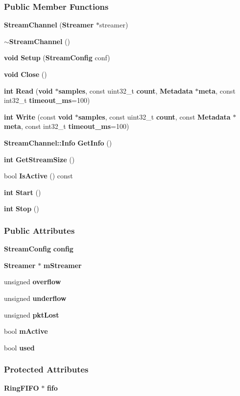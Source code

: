 \subsubsection*{Public Member Functions}
\begin{DoxyCompactItemize}
\item 
{\bf Stream\+Channel} ({\bf Streamer} $\ast$streamer)
\item 
{\bf $\sim$\+Stream\+Channel} ()
\item 
{\bf void} {\bf Setup} ({\bf Stream\+Config} conf)
\item 
{\bf void} {\bf Close} ()
\item 
{\bf int} {\bf Read} ({\bf void} $\ast${\bf samples}, const uint32\+\_\+t {\bf count}, {\bf Metadata} $\ast${\bf meta}, const int32\+\_\+t {\bf timeout\+\_\+ms}=100)
\item 
{\bf int} {\bf Write} (const {\bf void} $\ast${\bf samples}, const uint32\+\_\+t {\bf count}, const {\bf Metadata} $\ast${\bf meta}, const int32\+\_\+t {\bf timeout\+\_\+ms}=100)
\item 
{\bf Stream\+Channel\+::\+Info} {\bf Get\+Info} ()
\item 
{\bf int} {\bf Get\+Stream\+Size} ()
\item 
bool {\bf Is\+Active} () const 
\item 
{\bf int} {\bf Start} ()
\item 
{\bf int} {\bf Stop} ()
\end{DoxyCompactItemize}
\subsubsection*{Public Attributes}
\begin{DoxyCompactItemize}
\item 
{\bf Stream\+Config} {\bf config}
\item 
{\bf Streamer} $\ast$ {\bf m\+Streamer}
\item 
unsigned {\bf overflow}
\item 
unsigned {\bf underflow}
\item 
unsigned {\bf pkt\+Lost}
\item 
bool {\bf m\+Active}
\item 
bool {\bf used}
\end{DoxyCompactItemize}
\subsubsection*{Protected Attributes}
\begin{DoxyCompactItemize}
\item 
{\bf Ring\+F\+I\+FO} $\ast$ {\bf fifo}
\end{DoxyCompactItemize}


